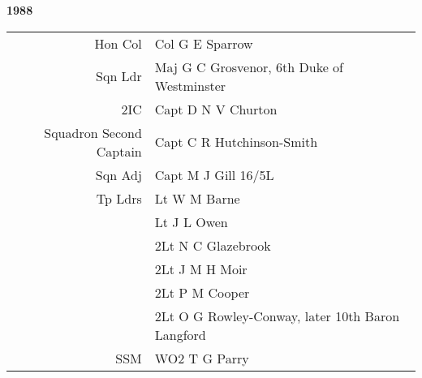 \begin{center}
  \Huge
  \textbf{1988}
\end{center}

\begin{center}
  \small
  \begin{tabular}{rl}
    Hon Col & Col G E Sparrow \\
    Sqn Ldr & Maj G C Grosvenor, 6th Duke of Westminster \\
    2IC & Capt D N V Churton \\
    Squadron Second Captain & Capt C R Hutchinson-Smith \\
    Sqn Adj & Capt M J Gill 16/5L \\
    Tp Ldrs & Lt W M Barne \\
      & Lt J L Owen \\
      & 2Lt N C Glazebrook \\
      & 2Lt J M H Moir \\
      & 2Lt P M Cooper \\
      & 2Lt O G Rowley-Conway, later 10th Baron Langford \\
    SSM & WO2 T G Parry \\
  \end{tabular}
\end{center}

